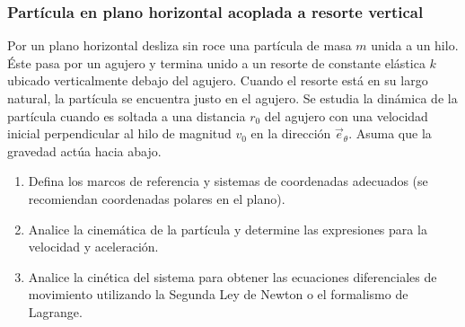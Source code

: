 \subsubsection{Partícula en plano horizontal acoplada a resorte vertical}

Por un plano horizontal desliza sin roce una partícula de masa $m$ unida a un hilo. Éste pasa por un agujero y termina unido a un resorte de constante elástica $k$ ubicado verticalmente debajo del agujero. Cuando el resorte está en su largo natural, la partícula se encuentra justo en el agujero. Se estudia la dinámica de la partícula cuando es soltada a una distancia $r_0$ del agujero con una velocidad inicial perpendicular al hilo de magnitud $v_0$ en la dirección $\vec{e}_\theta$. Asuma que la gravedad actúa hacia abajo.

\begin{enumerate}
    \item Defina los marcos de referencia y sistemas de coordenadas adecuados (se recomiendan coordenadas polares en el plano).
    \item Analice la cinemática de la partícula y determine las expresiones para la velocidad y aceleración.
    \item Analice la cinética del sistema para obtener las ecuaciones diferenciales de movimiento utilizando la Segunda Ley de Newton o el formalismo de Lagrange.
\end{enumerate}

